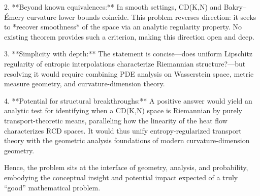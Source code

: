 2. **Beyond known equivalences:**  
   In smooth settings, CD(K,N) and Bakry–Émery curvature lower bounds coincide. This problem reverses direction: it seeks to *recover smoothness* of the space via an analytic regularity property. No existing theorem provides such a criterion, making this direction open and deep.  

3. **Simplicity with depth:**  
   The statement is concise—does uniform Lipschitz regularity of entropic interpolations characterize Riemannian structure?—but resolving it would require combining PDE analysis on Wasserstein space, metric measure geometry, and curvature-dimension theory.  

4. **Potential for structural breakthroughs:**  
   A positive answer would yield an analytic test for identifying when a CD(K,N) space is Riemannian by purely transport-theoretic means, paralleling how the linearity of the heat flow characterizes RCD spaces. It would thus unify entropy-regularized transport theory with the geometric analysis foundations of modern curvature-dimension geometry.  

Hence, the problem sits at the interface of geometry, analysis, and probability, embodying the conceptual insight and potential impact expected of a truly “good” mathematical problem.